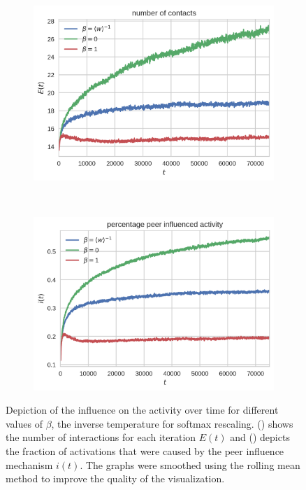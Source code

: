 \begin{figure}[htbp]
\centering
\begin{subfigure}[b]{0.485\textwidth}
  \includegraphics[width=\textwidth]{figures/number-of-contacts-beta}
  \caption{}
\label{fig:number-of-contacts-beta}
\end{subfigure}
~
\begin{subfigure}[b]{0.485\textwidth}
  \includegraphics[width=\textwidth]{figures/percentage-influenced-activity-beta}
  \caption{}
\label{fig:percentage-influenced-activity-beta}
\end{subfigure}

\caption[Network activity in different rescaling scenarios]{Depiction of the influence on the activity over time for different values of \( \beta \), the inverse temperature for softmax rescaling. () shows the number of interactions for each iteration \( E(t) \) and () depicts the fraction of activations that were caused by the peer influence mechanism \( i(t) \). The graphs were smoothed using the rolling mean method to improve the quality of the visualization.}
\label{fig:activity-beta-scenarios}
\end{figure}


